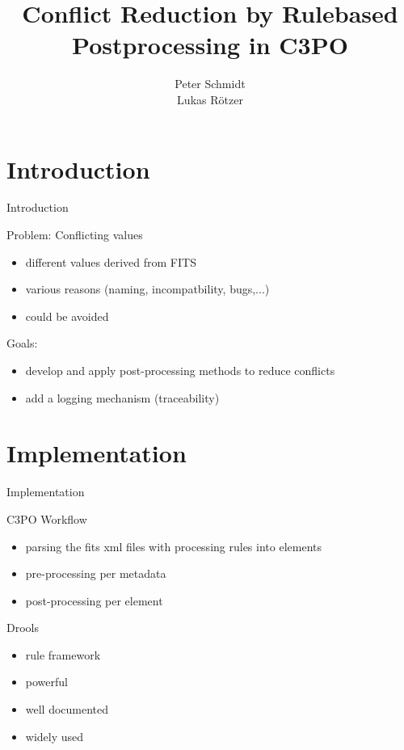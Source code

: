 \documentclass{beamer}
\title{Conflict Reduction by Rulebased Postprocessing in C3PO
}
\author[P. Schmidt, L. Rötzer]{
	Peter Schmidt\\ 
	Lukas Rötzer
}
\begin{document}
\frame{
  \titlepage
}

\section{Introduction}

\begin{frame}{Introduction}

   Problem: Conflicting values
    \begin{itemize}
      \item different values derived from FITS
      \item various reasons (naming, incompatbility, bugs,...)
      \item could be avoided
    \end{itemize}

    \vspace{5pt}
    Goals:
    \begin{itemize}
      \item develop and apply post-processing methods to reduce conflicts
      \item add a logging mechanism (traceability)
    \end{itemize} 
\note{

}
\end{frame}

\section{Implementation}

\begin{frame}{Implementation}

  C3PO Workflow
      \begin{itemize}
        \item parsing the fits xml files with processing rules into elements
        \item pre-processing per metadata
        \item post-processing per element
      \end{itemize}
   
    \vspace{5pt}
    Drools
        \begin{itemize}
          \item rule framework
          \item powerful
          \item well documented
          \item widely used
        \end{itemize}
\note{

}
\end{frame}
\end{document}
